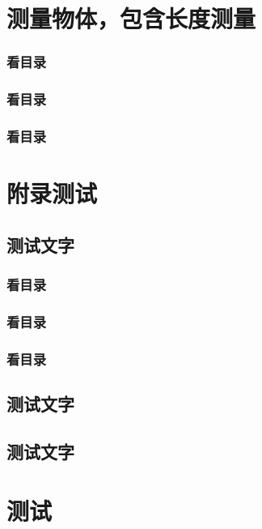 \section{测量物体，包含长度测量}

\subsubsection{看目录}

\subsubsection{看目录}

\subsubsection*{看目录}



\begin{Quiz}
	\section{附录测试}
	
	\subsection{测试文字}
	
	\subsubsection{看目录}
	
	\subsubsection{看目录}
	
	\subsubsection*{看目录}
	
	\subsection{测试文字}
	
	\subsection{测试文字}
	
	
	\section{测试}
	

	
\end{Quiz}

